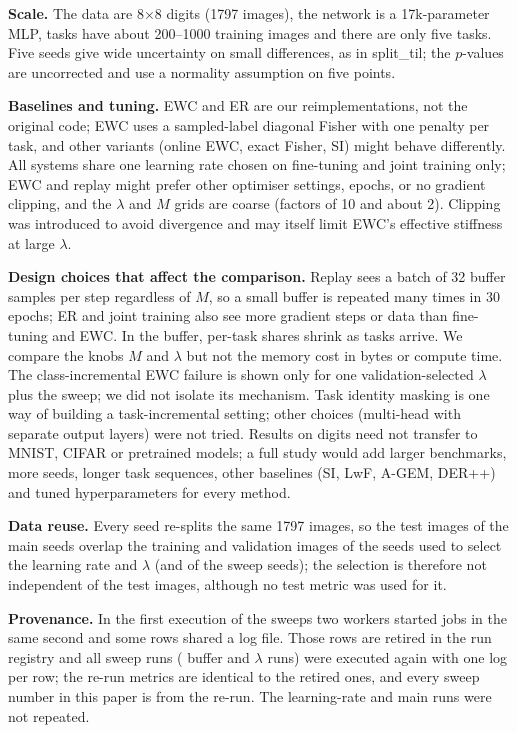 \textbf{Scale.} The data are 8$\times$8 digits (1797 images), the network is a 17k-parameter MLP, tasks have about 200--1000 training images and there are only five tasks. Five seeds give wide uncertainty on small differences, as in split\_til; the $p$-values are uncorrected and use a normality assumption on five points.

\textbf{Baselines and tuning.} EWC and ER are our reimplementations, not the original code; EWC uses a sampled-label diagonal Fisher with one penalty per task, and other variants (online EWC, exact Fisher, SI) might behave differently. All systems share one learning rate chosen on fine-tuning and joint training only; EWC and replay might prefer other optimiser settings, epochs, or no gradient clipping, and the $\lambda$ and $M$ grids are coarse (factors of 10 and about 2). Clipping was introduced to avoid divergence and may itself limit EWC's effective stiffness at large $\lambda$.

\textbf{Design choices that affect the comparison.} Replay sees a batch of 32 buffer samples per step regardless of $M$, so a small buffer is repeated many times in 30 epochs; ER and joint training also see more gradient steps or data than fine-tuning and EWC. In the buffer, per-task shares shrink as tasks arrive. We compare the knobs $M$ and $\lambda$ but not the memory cost in bytes or compute time. The class-incremental EWC failure is shown only for one validation-selected $\lambda$ plus the sweep; we did not isolate its mechanism. Task identity masking is one way of building a task-incremental setting; other choices (multi-head with separate output layers) were not tried. Results on digits need not transfer to MNIST, CIFAR or pretrained models; a full study would add larger benchmarks, more seeds, longer task sequences, other baselines (SI, LwF, A-GEM, DER++) and tuned hyperparameters for every method.


\textbf{Data reuse.} Every seed re-splits the same 1797 images, so the test images of the main seeds overlap the training and validation images of the seeds used to select the learning rate and $\lambda$ (and of the sweep seeds); the selection is therefore not independent of the test images, although no test metric was used for it.

\textbf{Provenance.} In the first execution of the sweeps two workers started jobs in the same second and some rows shared a log file. Those rows are retired in the run registry and all sweep runs ( buffer and  $\lambda$ runs) were executed again with one log per row; the re-run metrics are identical to the retired ones, and every sweep number in this paper is from the re-run. The learning-rate and main runs were not repeated.
